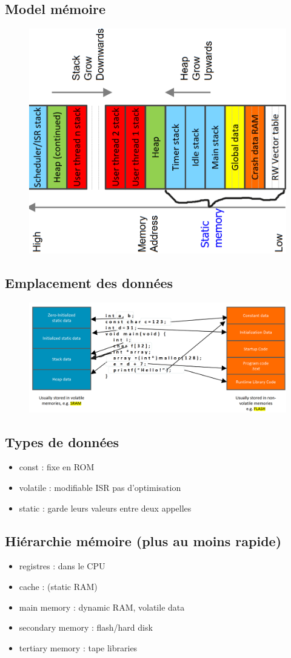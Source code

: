 \documentclass[resume]{subfiles}
\begin{document}
\subsection{Model mémoire}
\begin{figure}[H]
    \centering
    \includegraphics[width=0.6\columnwidth]{Figures/memoire/memoire.png}
\end{figure}

\subsection{Emplacement des données}
\begin{figure}[H]
    \centering
    \includegraphics[width=0.6\columnwidth]{Figures/memoire/dataStorage.png}
\end{figure}

\subsection{Types de données}
\begin{itemize}
\item const : fixe en ROM
\item volatile : modifiable ISR pas d'optimisation
\item static : garde leurs valeurs entre deux appelles
\end{itemize}

\subsection{Hiérarchie mémoire (plus au moins rapide)}
\begin{itemize}
\item registres : dans le CPU
\item cache : (static RAM)
\item main memory : dynamic RAM, volatile data
\item secondary memory : flash/hard disk
\item tertiary memory : tape libraries
\end{itemize}
\end{document}
